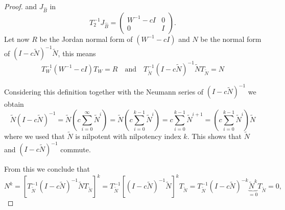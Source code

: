 \begin{proof}
	and $J_{\hat{B}}$ in
	\begin{displaymath}
		T_2^{-1}J_{\hat{B}} =
		\left(
		\begin{matrix}
			W^{-1}-cI & 0 \\
			0 & I
		\end{matrix}
		\right) .
	\end{displaymath}
	Let now $R$ be the Jordan normal form of $(W^{-1}-cI)$ and $N$ be the normal form of $(I-c\tilde{N})^{-1}\tilde{N}$, this means
	\begin{displaymath}
		T_W^{-1}(W^{-1}-cI)T_W = R \quad \text{and} \quad T_{\tilde{N}}^{-1}(I-c\tilde{N})^{-1}\tilde{N}T_{\tilde{N}} = N
	\end{displaymath}

	Considering this definition together with the Neumann series of $(I-c\tilde{N})^{-1}$ we obtain
	\begin{displaymath}
		\tilde{N} (I-c\tilde{N})^{-1} = \tilde{N} (c \sum_{i=0}^{\infty} \tilde{N}^i) = \tilde{N} (c \sum_{i=0}^{k-1} \tilde{N}^i) = c \sum_{i=0}^{k-1} \tilde{N}^{i+1} = (c \sum_{i=0}^{k-1} \tilde{N}^{i}) \tilde{N}
	\end{displaymath}
	where we used that $\tilde{N}$ is nilpotent with nilpotency index $k$. This shows that $\tilde{N}$ and $(I-c\tilde{N})^{-1}$ commute.
	
	From this we conclude that
	\begin{displaymath}
		N^k = [T_{\tilde{N}}^{-1}(I-c\tilde{N})^{-1}\tilde{N}T_{\tilde{N}}]^k = T_{\tilde{N}}^{-1}[(I-c\tilde{N})^{-1}\tilde{N}]^kT_{\tilde{N}} = T_{\tilde{N}}^{-1}(I-c\tilde{N})^{-k}\underbrace{\tilde{N}^k}_{=0}T_{\tilde{N}} = 0,
	\end{displaymath}
	

\end{proof}
